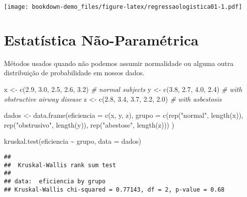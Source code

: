 \documentclass[
]{book}
\newenvironment{Shaded}{\begin{snugshade}}{\end{snugshade}}
\newcommand{\AttributeTok}[1]{\textcolor[rgb]{0.77,0.63,0.00}{#1}}
\newcommand{\CommentTok}[1]{\textcolor[rgb]{0.56,0.35,0.01}{\textit{#1}}}
\newcommand{\FloatTok}[1]{\textcolor[rgb]{0.00,0.00,0.81}{#1}}
\newcommand{\FunctionTok}[1]{\textcolor[rgb]{0.00,0.00,0.00}{#1}}
\newcommand{\NormalTok}[1]{#1}
\newcommand{\OtherTok}[1]{\textcolor[rgb]{0.56,0.35,0.01}{#1}}
\newcommand{\SpecialCharTok}[1]{\textcolor[rgb]{0.00,0.00,0.00}{#1}}
\newcommand{\StringTok}[1]{\textcolor[rgb]{0.31,0.60,0.02}{#1}}
\begin{document}
\texttt{[image: bookdown-demo\_files/figure-latex/regressaologistica01-1.pdf]}

\hypertarget{estatisticanaoparametrica}{%
\chapter*{Estatística Não-Paramétrica}\label{estatisticanaoparametrica}}

Métodos usados quando não podemos assumir normalidade ou alguma outra distribuição de probabilidade em nossos dados.

\begin{Shaded}
\begin{Highlighting}[]
\NormalTok{x }\OtherTok{\textless{}{-}} \FunctionTok{c}\NormalTok{(}\FloatTok{2.9}\NormalTok{, }\FloatTok{3.0}\NormalTok{, }\FloatTok{2.5}\NormalTok{, }\FloatTok{2.6}\NormalTok{, }\FloatTok{3.2}\NormalTok{) }\CommentTok{\# normal subjects}
\NormalTok{y }\OtherTok{\textless{}{-}} \FunctionTok{c}\NormalTok{(}\FloatTok{3.8}\NormalTok{, }\FloatTok{2.7}\NormalTok{, }\FloatTok{4.0}\NormalTok{, }\FloatTok{2.4}\NormalTok{)      }\CommentTok{\# with obstructive airway disease}
\NormalTok{z }\OtherTok{\textless{}{-}} \FunctionTok{c}\NormalTok{(}\FloatTok{2.8}\NormalTok{, }\FloatTok{3.4}\NormalTok{, }\FloatTok{3.7}\NormalTok{, }\FloatTok{2.2}\NormalTok{, }\FloatTok{2.0}\NormalTok{) }\CommentTok{\# with asbestosis}

\NormalTok{dados }\OtherTok{\textless{}{-}} \FunctionTok{data.frame}\NormalTok{(}\AttributeTok{eficiencia =} \FunctionTok{c}\NormalTok{(x, y, z),}
                    \AttributeTok{grupo =} \FunctionTok{c}\NormalTok{(}\FunctionTok{rep}\NormalTok{(}\StringTok{"normal"}\NormalTok{, }\FunctionTok{length}\NormalTok{(x)),}
                              \FunctionTok{rep}\NormalTok{(}\StringTok{"obstrusivo"}\NormalTok{, }\FunctionTok{length}\NormalTok{(y)),}
                              \FunctionTok{rep}\NormalTok{(}\StringTok{"abestose"}\NormalTok{, }\FunctionTok{length}\NormalTok{(z)))}
\NormalTok{                    )}

\FunctionTok{kruskal.test}\NormalTok{(eficiencia }\SpecialCharTok{\textasciitilde{}}\NormalTok{ grupo,}
             \AttributeTok{data =}\NormalTok{ dados)}
\end{Highlighting}
\end{Shaded}

\begin{verbatim}
## 
##  Kruskal-Wallis rank sum test
## 
## data:  eficiencia by grupo
## Kruskal-Wallis chi-squared = 0.77143, df = 2, p-value = 0.68
\end{verbatim}
\end{document}
